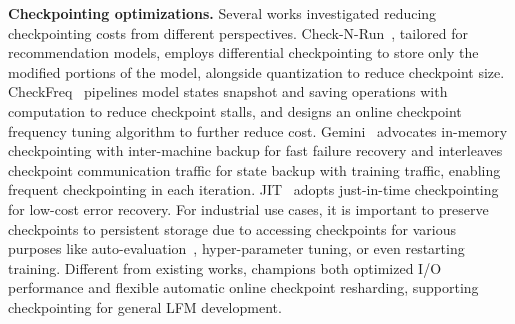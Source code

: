 \noindent \textbf{Checkpointing optimizations.} Several %
works \cite{projectadam, deepfreeze} %
 investigated reducing checkpointing costs from different perspectives.
Check-N-Run~\cite{check-n-run}, tailored for recommendation models, employs differential checkpointing to store only the modified portions of the model, alongside quantization %
to reduce checkpoint size. %
CheckFreq~\cite{checkfreq} pipelines model states snapshot and saving operations with computation to reduce checkpoint stalls, and designs an online checkpoint frequency tuning algorithm to further reduce cost. 
Gemini~\cite{gemini-sys} advocates in-memory checkpointing with inter-machine backup for fast failure recovery and interleaves checkpoint communication traffic for state backup with training traffic, enabling frequent checkpointing in each iteration. JIT~\cite{jit-check} adopts just-in-time checkpointing for low-cost error recovery. 
For industrial use cases, it is important to preserve checkpoints to persistent storage due to %
accessing checkpoints for various %
purposes like auto-evaluation~\cite{characterization}, hyper-parameter tuning, or even restarting training.
Different from existing works, \sys{} champions both optimized I/O performance and flexible automatic online checkpoint resharding, supporting checkpointing for general LFM development.

